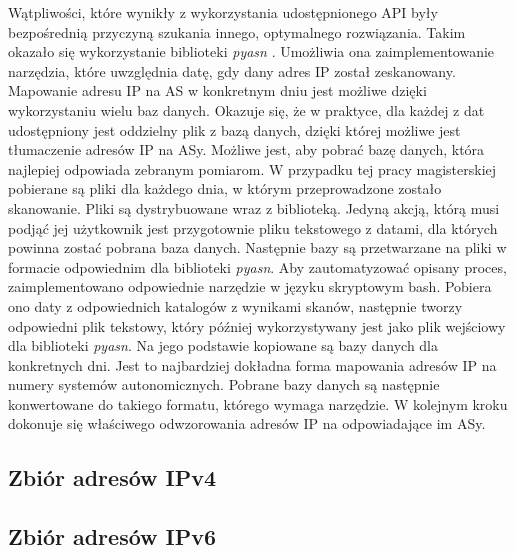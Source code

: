 Wątpliwości, które wynikły z wykorzystania udostępnionego API były bezpośrednią przyczyną szukania innego, optymalnego rozwiązania. Takim okazało się wykorzystanie biblioteki \textit{pyasn} \cite{pyasn}. Umożliwia ona zaimplementowanie narzędzia, które uwzględnia datę, gdy dany adres IP został zeskanowany. Mapowanie adresu IP na AS w konkretnym dniu jest możliwe dzięki wykorzystaniu wielu baz danych. Okazuje się, że w praktyce, dla każdej z dat udostępniony jest oddzielny plik z bazą danych, dzięki której możliwe jest tłumaczenie adresów IP na ASy. Możliwe jest, aby pobrać bazę danych, która najlepiej odpowiada zebranym pomiarom. W przypadku tej pracy magisterskiej pobierane są pliki dla każdego dnia, w którym przeprowadzone zostało skanowanie. Pliki są dystrybuowane wraz z biblioteką. Jedyną akcją, którą musi podjąć jej użytkownik jest przygotownie pliku tekstowego z datami, dla których powinna zostać pobrana baza danych. Następnie bazy są przetwarzane na pliki w formacie odpowiednim dla biblioteki \textit{pyasn}. Aby zautomatyzować opisany proces, zaimplementowano odpowiednie narzędzie w języku skryptowym bash. Pobiera ono daty z odpowiednich katalogów z wynikami skanów, następnie tworzy odpowiedni plik tekstowy, który później wykorzystywany jest jako plik wejściowy dla biblioteki \textit{pyasn}. Na jego podstawie kopiowane są bazy danych dla konkretnych dni. Jest to najbardziej dokładna forma mapowania adresów IP na numery systemów autonomicznych. Pobrane bazy danych są następnie konwertowane do takiego formatu, którego wymaga narzędzie. W kolejnym kroku dokonuje się właściwego odwzorowania adresów IP na odpowiadające im ASy.

\subsection{Zbiór adresów IPv4}


\subsection{Zbiór adresów IPv6}


